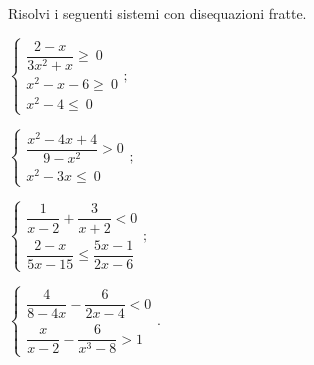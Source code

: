 \begin{esercizio}[\Ast]
\label{ese:18.73}
Risolvi i seguenti sistemi con disequazioni fratte.
\begin{multicols}{2}
\begin{enumeratea}{\longarray
 \item $\left\{\begin{array}{l}
		\dfrac{2-x}{3x^{2}+x}\ge~0\\
		x^{2}-x-6\ge~0\\
		x^{2}-4\le~0
	\end{array}\right.;$
\item $\left\{\begin{array}{l}
        \dfrac{x^{2}-4x+4}{9-x^{2}}>0\\
        x^{2}-3x\le~0
       \end{array}\right.;$
\item $\left\{\begin{array}{l}
	   \dfrac{1}{x-2}+\dfrac{3}{x+2}<0\\
	   \dfrac{2-x}{5x-15}\le\dfrac{5x-1}{2x-6}
	   \end{array}\right.;$
\item $\left\{\begin{array}{l}
	   \dfrac{4}{8-4x}-\dfrac{6}{2x-4}<0\\
	   \dfrac{x}{x-2}-\dfrac{6}{x^{3}-8}>1
	   \end{array}\right..$}
\end{enumeratea}
\end{multicols}
\end{esercizio}

